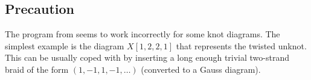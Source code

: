 \documentclass[11pt]{article}
\begin{document}
\subsection{Precaution}

The program from \cite{katlas} seems to work incorrectly for some knot diagrams. The simplest example is the diagram $X[1,2,2,1]$ that represents the twisted unknot. This can be usually coped with by inserting a long enough trivial two-strand  braid of the form $(1,-1,1,-1,\ldots)$ (converted to a Gauss diagram).

\end{document}
